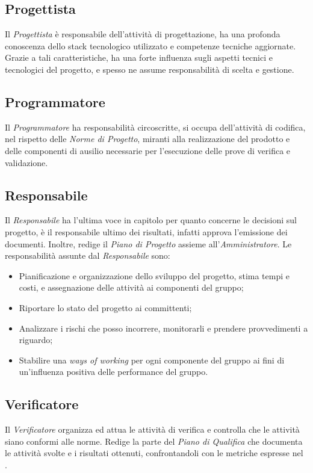 	\subsection{Progettista}

	Il \textit{Progettista} è responsabile dell'attività di progettazione, ha una profonda conoscenza dello stack tecnologico utilizzato e competenze tecniche aggiornate. Grazie a tali caratteristiche, ha una forte influenza sugli aspetti tecnici e tecnologici del progetto, e spesso ne assume responsabilità di scelta e gestione.


	\subsection{Programmatore}

	Il \textit{Programmatore} ha responsabilità circoscritte, si occupa dell'attività di codifica, nel rispetto delle \textit{Norme di Progetto}, miranti alla realizzazione del prodotto e delle componenti di ausilio necessarie per l'esecuzione delle prove di verifica e validazione.


	\subsection{Responsabile}
	
	Il \textit{Responsabile} ha l'ultima voce in capitolo per quanto concerne le decisioni sul progetto, è il responsabile ultimo dei risultati, infatti approva l'emissione dei documenti. Inoltre, redige il \textit{Piano di Progetto} assieme all'\textit{Amministratore}. 
	Le responsabilità assunte dal \textit{Responsabile} sono:

	\begin{itemize}

		\item Pianificazione e organizzazione dello sviluppo del progetto, stima tempi e costi, e assegnazione delle attività ai componenti del gruppo;
		\item Riportare lo stato del progetto ai committenti;
		\item Analizzare i rischi che posso incorrere, monitorarli e prendere provvedimenti a riguardo;
		\item Stabilire una \textit{ways of working} per ogni componente del gruppo ai fini di un'influenza positiva delle performance del gruppo.
	
	\end{itemize}

	
	\subsection{Verificatore}

	Il \textit{Verificatore} organizza ed attua le attività di verifica e controlla che le attività siano conformi alle norme. Redige la parte del \textit{Piano di Qualifica} che documenta le attività svolte e i risultati ottenuti, confrontandoli con le metriche espresse nel \PianoDiQualifica. 